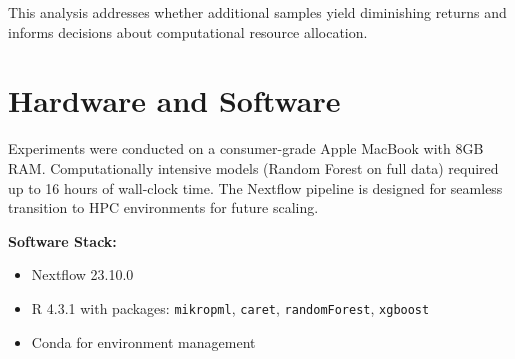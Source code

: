This analysis addresses whether additional samples yield diminishing returns and informs decisions about computational resource allocation.

\section{Hardware and Software}

Experiments were conducted on a consumer-grade Apple MacBook with 8GB RAM. Computationally intensive models (Random Forest on full data) required up to 16 hours of wall-clock time. The Nextflow pipeline is designed for seamless transition to HPC environments for future scaling.

\textbf{Software Stack:}
\begin{itemize}
    \item Nextflow 23.10.0
    \item R 4.3.1 with packages: \texttt{mikropml}, \texttt{caret}, \texttt{randomForest}, \texttt{xgboost}
    \item Conda for environment management
\end{itemize}
